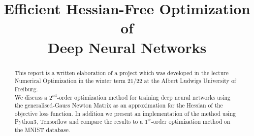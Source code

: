 \documentclass[conference]{IEEEtran}
\begin{document}
	\title{Efficient Hessian-Free Optimization of \\Deep Neural Networks}


	\author{
		\and
		\and
	}

	\maketitle
	\thispagestyle{plain}
	\pagestyle{plain}

	\begin{abstract}
		\noindent
		This report is a written elaboration of a project which was developed in the lecture Numerical Optimization in the winter term 21/22 at the Albert Ludwigs University of Freiburg.\\
		We discuss a $2^{\text{nd}}$-order optimization method for training deep neural networks using the generalised-Gauss Newton Matrix as an approximation for the Hessian of the objective loss function. In addition we present an implementation of the method using Python3, Tensorflow and compare the results to a $1^{\text{st}}$-order optimization method on the MNIST database.
	\end{abstract}
\end{document}
